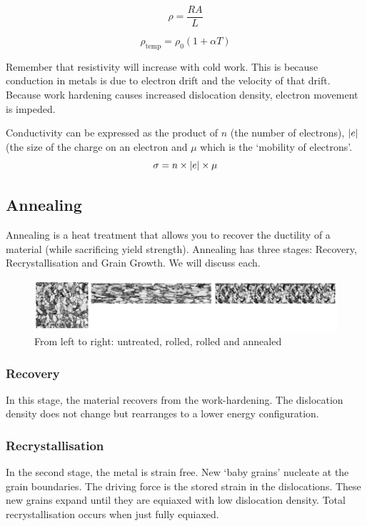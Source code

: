\documentclass[12pt]{article}
\begin{document}
\begin{equation*}
  \rho = \frac{RA}{L}
\end{equation*}

\begin{equation*}
  \rho_{\text{temp}} = \rho_0 (1+\alpha T)
\end{equation*}

Remember that resistivity will increase with cold work.
This is because conduction in metals is due to electron drift and the velocity of that drift.
Because work hardening causes increased dislocation density, electron movement is impeded.

Conductivity can be expressed as the product of $n$ (the number of electrons), $\abs{e}$ (the size of the charge on an electron and $\mu$ which is the `mobility of electrons'. 
\begin{equation*}
  \sigma = n \times \abs{e} \times \mu 
\end{equation*}

\subsection{Annealing}Annealing is a heat treatment that allows you to recover the ductility of a material (while sacrificing yield strength).
Annealing has three stages: Recovery, Recrystallisation and Grain Growth.
We will discuss each.

\begin{figure}[h]
  \includegraphics[scale=0.4]{annealing}
  \caption{From left to right: untreated, rolled, rolled and annealed}
\end{figure}

\subsubsection{Recovery}
In this stage, the material recovers from the work-hardening. 
The dislocation density does not change but rearranges to a lower energy configuration.

\subsubsection{Recrystallisation}
In the second stage, the metal is strain free.
New `baby grains' nucleate at the grain boundaries.
The driving force is the stored strain in the dislocations.
These new grains expand until they are equiaxed with low dislocation density.
Total recrystallisation occurs when just fully equiaxed.
\end{document}
